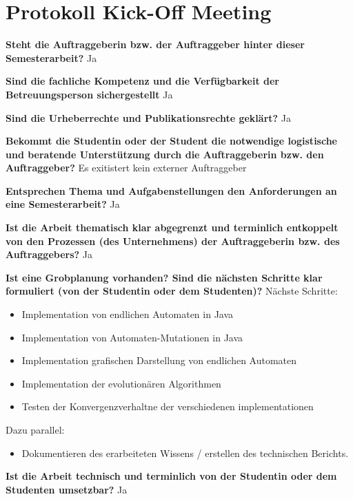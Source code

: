 \section*{Protokoll Kick-Off Meeting}
\textbf{Steht die Auftraggeberin bzw. der Auftraggeber hinter dieser Semesterarbeit?}\newline 
Ja

\textbf{Sind die fachliche Kompetenz und die Verfügbarkeit der Betreuungsperson sichergestellt}\newline 
Ja

\textbf{Sind die Urheberrechte und Publikationsrechte geklärt?}\newline 
Ja

\textbf{Bekommt die Studentin oder der Student die notwendige logistische und beratende Unterstützung durch die Auftraggeberin bzw. den Auftraggeber?}\newline 
Es exitistert kein externer Auftraggeber

\textbf{Entsprechen Thema und Aufgabenstellungen den Anforderungen an eine Semesterarbeit?}\newline 
Ja

\textbf{Ist die Arbeit thematisch klar abgegrenzt und terminlich entkoppelt von den Prozessen (des Unternehmens) der Auftraggeberin bzw. des Auftraggebers?}\newline 
Ja

\textbf{Ist eine Grobplanung vorhanden? Sind die nächsten Schritte klar formuliert (von der Studentin oder dem Studenten)?}\newline 
Nächste Schritte:\\
\begin{itemize}
	\item Implementation von endlichen Automaten in Java
	\item Implementation von Automaten-Mutationen in Java
	\item Implementation grafischen Darstellung von endlichen Automaten
	\item Implementation der evolutionären Algorithmen
	\item Testen der Konvergenzverhaltne der verschiedenen implementationen
\end{itemize}

Dazu parallel:\\
\begin{itemize}
	\item Dokumentieren des erarbeiteten Wissens / erstellen des technischen Berichts.
\end{itemize}

\textbf{Ist die Arbeit technisch und terminlich von der Studentin oder dem Studenten umsetzbar?}\newline 
Ja
